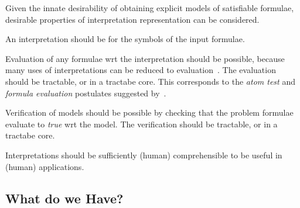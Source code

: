 \documentclass{easychair}
\newenvironment{packed_itemize}{
\vspace*{-0.3em}
\begin{itemize}
\setlength{\partopsep}{0pt}
\setlength{\itemsep}{1pt}
\setlength{\parskip}{0pt}
\setlength{\parsep}{0pt}
}{\end{itemize}}
\begin{document}
Given the innate desirability of obtaining explicit models of satisfiable formulae, desirable
properties of interpretation representation can be considered.
\begin{packed_itemize}
\item An interpretation should be for the symbols of the input formulae.
\item Evaluation of any formulae wrt the interpretation should be possible, because many uses of
      interpretations can be reduced to evaluation~\cite[\S3.2]{CLP04}.
      The evaluation should be tractable, or in a tractabe core.
      This corresponds to the \emph{atom test} and \emph{formula evaluation} postulates suggested
      by~\cite{FL96,CLP04}.
\item Verification of models should be possible by checking that the problem formulae evaluate 
      to \textit{true} wrt the model.
      The verification should be tractable, or in a tractabe core.
\item Interpretations should be sufficiently (human) comprehensible to be useful in (human)
      applications.
\end{packed_itemize}

\subsection{What do we Have?}
\label{Have}
\end{document}
